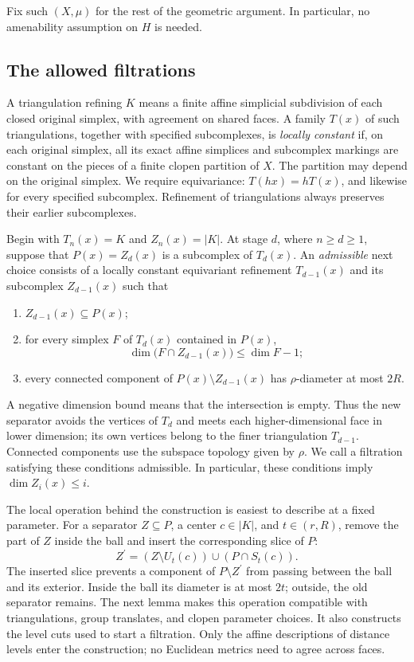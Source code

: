 Fix such $(X,\mu)$ for the rest of the geometric argument.  In
particular, no amenability assumption on $H$ is needed.

\subsection{The allowed filtrations}

A triangulation refining $K$ means a finite affine simplicial
subdivision of each closed original simplex, with agreement on shared
faces.  A family $T(x)$ of such triangulations, together with specified
subcomplexes, is \emph{locally constant} if, on each original simplex,
all its exact affine simplices and subcomplex markings are constant on
the pieces of a finite clopen partition of $X$.  The partition may
depend on the original simplex.  We require equivariance:
$T(hx)=hT(x)$, and likewise for every specified subcomplex.
Refinement of triangulations always preserves their earlier
subcomplexes.

Begin with $T_n(x)=K$ and $Z_n(x)=|K|$.  At stage $d$, where
$n\ge d\ge1$, suppose that $P(x)=Z_d(x)$ is a subcomplex of $T_d(x)$.
An \emph{admissible} next choice consists of a locally constant equivariant
refinement $T_{d-1}(x)$ and its subcomplex $Z_{d-1}(x)$ such that
\begin{enumerate}[label=\textup{(\roman*)}]
\item $Z_{d-1}(x)\subseteq P(x)$;
\item for every simplex $F$ of $T_d(x)$ contained in $P(x)$,
\[
 \dim\bigl(F\cap Z_{d-1}(x)\bigr)\le\dim F-1;
\]
\item every connected component of $P(x)\setminus Z_{d-1}(x)$ has
$\rho$-diameter at most $2R$.
\end{enumerate}
A negative dimension bound means that the intersection is empty.
Thus the new separator avoids the vertices of $T_d$ and meets each
higher-dimensional face in lower dimension; its own vertices belong to
the finer triangulation $T_{d-1}$.
Connected components use the subspace topology given by $\rho$.
We call a filtration satisfying these conditions admissible.
In particular, these conditions imply $\dim Z_i(x)\le i$.

The local operation behind the construction is easiest to describe at a
fixed parameter. For a separator $Z\subseteq P$, a center $c\in|K|$,
and $t\in(r,R)$, remove the part of $Z$ inside the ball and insert
the corresponding slice of $P$:
\[
 Z^{\prime}=(Z\setminus U_t(c))\cup(P\cap S_t(c)).
\]
The inserted slice prevents a component of $P\setminus Z^{\prime}$
from passing between the ball and its exterior. Inside the ball its
diameter is at most $2t$; outside, the old separator remains.
The next lemma makes this operation compatible with triangulations,
group translates, and clopen parameter choices. It also constructs the
level cuts used to start a filtration. Only the affine descriptions of
distance levels enter the construction; no Euclidean metrics need to
agree across faces.


